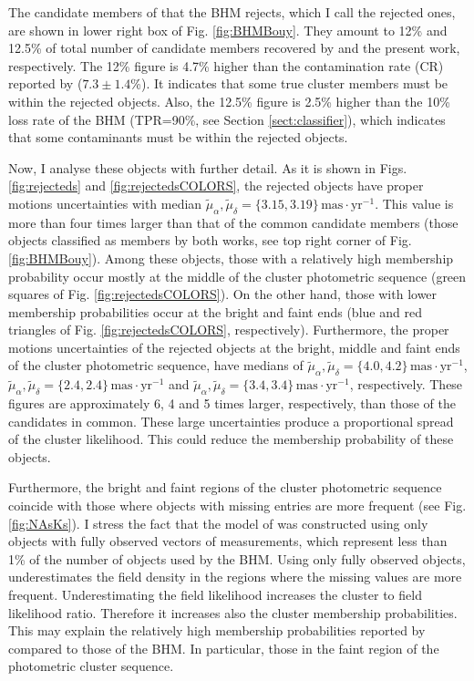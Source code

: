 The candidate members of \citet{Bouy2015} that the BHM rejects, which I call the rejected ones, are shown in lower right box of Fig. \ref{fig:BHMBouy}. They amount to 12\% and 12.5\% of total number of candidate members recovered by \citet{Bouy2015} and the present work, respectively. The 12\% figure is 4.7\% higher than the contamination rate (CR) reported by \citet{Sarro2014} ($7.3\pm1.4$\%). It indicates that some true cluster members must be within the rejected objects. Also, the 12.5\% figure is 2.5\% higher than the 10\% loss rate of the BHM (TPR=90\%, see Section \ref{sect:classifier}), which indicates that some contaminants must be within the rejected objects.

Now, I analyse these objects with further detail. As it is shown in Figs. \ref{fig:rejecteds} and \ref{fig:rejectedsCOLORS}, the rejected objects have proper motions uncertainties with median $\tilde{\mu}_{\alpha},\tilde{\mu}_{\delta}=\{3.15,3.19\} \,\mathrm{mas\cdot yr^{-1}}$. This value is more than four times larger than that of the common candidate members (those objects classified as members by both works, see top right corner of Fig. \ref{fig:BHMBouy}). Among these objects, those with a relatively high membership probability occur mostly at the middle of the cluster photometric sequence (green squares of Fig. \ref{fig:rejectedsCOLORS}). On the other hand, those with lower membership probabilities occur at the bright and faint ends (blue and red triangles of Fig. \ref{fig:rejectedsCOLORS}, respectively). Furthermore, the proper motions uncertainties of the rejected objects at the bright, middle and faint ends of the cluster photometric sequence, have medians of $\tilde{\mu}_{\alpha},\tilde{\mu}_{\delta}=\{4.0,4.2\}  \,\mathrm{mas\cdot yr^{-1}}$, $\tilde{\mu}_{\alpha},\tilde{\mu}_{\delta}=\{2.4,2.4\}\,\mathrm{mas\cdot yr^{-1}}$ and $\tilde{\mu}_{\alpha},\tilde{\mu}_{\delta}=\{3.4,3.4\}\,\mathrm{mas\cdot yr^{-1}}$, respectively. These figures are approximately 6, 4 and 5 times larger, respectively, than those of the candidates in common. These large uncertainties produce a proportional spread of the cluster likelihood. This could reduce the membership probability of these objects.

Furthermore, the bright and faint regions of the cluster photometric sequence coincide with those where objects with missing entries are more frequent (see Fig. \ref{fig:NAsKs}). I stress the fact that the model of \citet{Bouy2015} was constructed using only objects with fully observed vectors of measurements, which represent less than 1\% of the number of objects used by the BHM. Using only fully observed objects, underestimates the field density in the regions where the missing values are more frequent. Underestimating the field likelihood increases the cluster to field likelihood ratio. Therefore it increases also the cluster membership probabilities. This may explain the relatively high membership probabilities reported by \citet{Bouy2015} compared to those of the BHM. In particular, those in the faint region of the photometric cluster sequence. 


